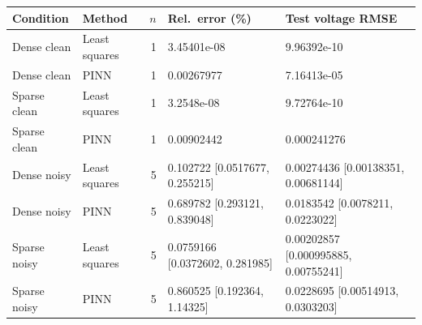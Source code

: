 \begin{tabular}{@{}llrll@{}}
\toprule
Condition & Method & \(n\) & Rel.\ error (\%) & Test voltage RMSE \\
\midrule
Dense clean & Least squares & 1 & 3.45401e-08 & 9.96392e-10 \\
Dense clean & PINN & 1 & 0.00267977 & 7.16413e-05 \\
Sparse clean & Least squares & 1 & 3.2548e-08 & 9.72764e-10 \\
Sparse clean & PINN & 1 & 0.00902442 & 0.000241276 \\
Dense noisy & Least squares & 5 & 0.102722 [0.0517677, 0.255215] & 0.00274436 [0.00138351, 0.00681144] \\
Dense noisy & PINN & 5 & 0.689782 [0.293121, 0.839048] & 0.0183542 [0.0078211, 0.0223022] \\
Sparse noisy & Least squares & 5 & 0.0759166 [0.0372602, 0.281985] & 0.00202857 [0.000995885, 0.00755241] \\
Sparse noisy & PINN & 5 & 0.860525 [0.192364, 1.14325] & 0.0228695 [0.00514913, 0.0303203] \\
\bottomrule
\end{tabular}
